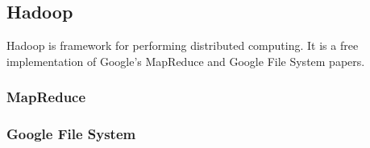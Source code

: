 \subsection{Hadoop}
Hadoop is framework for performing distributed computing. It is a free implementation of Google's MapReduce and Google File System papers. \cite{mapreduce}

\subsubsection{MapReduce}


\subsubsection{Google File System}

